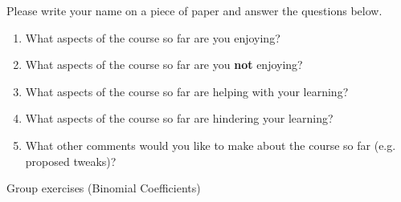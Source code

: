 \documentclass[10pt]{beamer}
\begin{document}
\begin{frame}

\begin{myyellowbox}[title= \text{Course Feedback Instructions}]
Please write your name on a piece of paper and answer the questions below. 
\end{myyellowbox}

\vfill 
\begin{mygreenbox}[title= \text{Course Feedback}]
\begin{enumerate}
	\item What aspects of the course so far are you enjoying?
	\item What aspects of the course so far are you \textbf{not} enjoying? 
	\item What aspects of the course so far are helping with your learning?
	\item What aspects of the course so far are hindering your learning?
	\item What other comments would you like to make about the course so far (e.g. proposed tweaks)? 
\end{enumerate}
\end{mygreenbox}

	
\end{frame}






\begin{frame}[standout]
Group exercises (Binomial Coefficients)
\end{frame}
\end{document}
